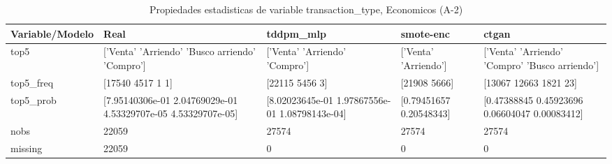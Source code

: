 \begin{table}[H]
\centering
\fontsize{8}{14}\selectfont
\caption{Propiedades  estadisticas de variable transaction\_type, Economicos (A-2)}
\label{table-stats-economicos-a-2-transaction_type}
\begin{tabular}{|l|m{10em}|m{10em}|m{10em}|m{10em}|}
\hline
 \rowcolor[gray]{0.8}
Variable/Modelo & Real & tddpm\_mlp & smote-enc & ctgan \\
\hline top5 & ['Venta' 'Arriendo' 'Busco arriendo' 'Compro'] & ['Venta' 'Arriendo' 'Compro'] & ['Venta' 'Arriendo'] & ['Venta' 'Arriendo' 'Compro' 'Busco arriendo'] \\
\hline top5\_freq & [17540  4517     1     1] & [22115  5456     3] & [21908  5666] & [13067 12663  1821    23] \\
\hline top5\_prob & [7.95140306e-01 2.04769029e-01 4.53329707e-05 4.53329707e-05] & [8.02023645e-01 1.97867556e-01 1.08798143e-04] & [0.79451657 0.20548343] & [0.47388845 0.45923696 0.06604047 0.00083412] \\
\hline nobs & 22059 & 27574 & 27574 & 27574 \\
\hline missing & 22059 & 0 & 0 & 0 \\
\hline
\end{tabular}
\end{table}
